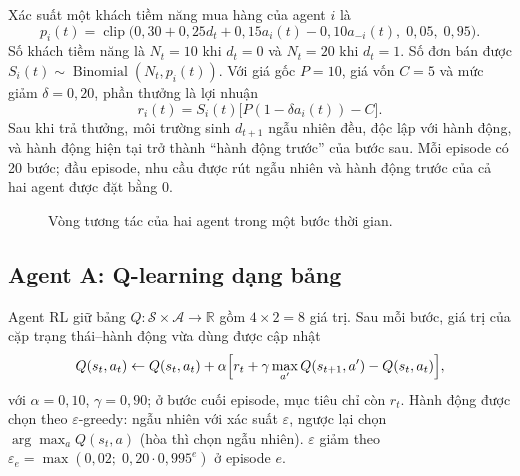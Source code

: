 \documentclass[12pt,a4paper]{report}
\begin{document}
Xác suất một khách tiềm năng mua hàng của agent $i$ là
\begin{equation}
p_i(t)=\operatorname{clip}\bigl(0{,}30+0{,}25d_t+0{,}15a_i(t)-0{,}10a_{-i}(t),\;0{,}05,\;0{,}95\bigr).
\label{eq:conv}
\end{equation}
Số khách tiềm năng là $N_t=10$ khi $d_t=0$ và $N_t=20$ khi $d_t=1$. Số đơn bán được
$S_i(t)\sim\operatorname{Binomial}(N_t,p_i(t))$. Với giá gốc $P=10$, giá vốn $C=5$
và mức giảm $\delta=0{,}20$, phần thưởng là lợi nhuận
\begin{equation}
r_i(t)=S_i(t)\bigl[P(1-\delta a_i(t))-C\bigr].
\label{eq:reward}
\end{equation}
Sau khi trả thưởng, môi trường sinh $d_{t+1}$ ngẫu nhiên đều, độc lập với hành động,
và hành động hiện tại trở thành ``hành động trước'' của bước sau. Mỗi episode có
20 bước; đầu episode, nhu cầu được rút ngẫu nhiên và hành động trước của cả hai
agent được đặt bằng 0.

\begin{figure}[H]
\centering
{}
\caption{Vòng tương tác của hai agent trong một bước thời gian.}
\label{fig:loop}
\end{figure}

\subsection{Agent A: Q-learning dạng bảng}
Agent RL giữ bảng $Q:\mathcal S\times\mathcal A\to\mathbb R$ gồm $4\times2=8$ giá trị.
Sau mỗi bước, giá trị của cặp trạng thái--hành động vừa dùng được cập nhật
\begin{equation}
Q(s_t,a_t)\leftarrow Q(s_t,a_t)+\alpha\Bigl[r_t+\gamma\max_{a'}Q(s_{t+1},a')-Q(s_t,a_t)\Bigr],
\label{eq:q}
\end{equation}
với $\alpha=0{,}10$, $\gamma=0{,}90$; ở bước cuối episode, mục tiêu chỉ còn $r_t$.
Hành động được chọn theo $\varepsilon$-greedy: ngẫu nhiên với xác suất
$\varepsilon$, ngược lại chọn $\arg\max_aQ(s_t,a)$ (hòa thì chọn ngẫu nhiên).
$\varepsilon$ giảm theo $\varepsilon_e=\max(0{,}02;\;0{,}20\cdot0{,}995^{e})$ ở episode $e$.
\end{document}
